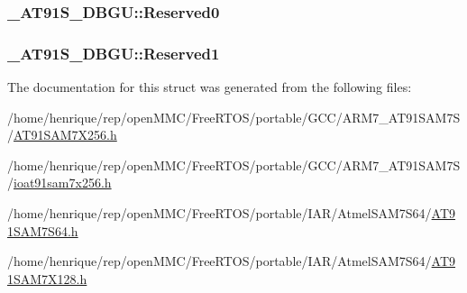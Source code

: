 \hypertarget{struct__AT91S__DBGU_a255e0adaab84068d3bdf2540d73e8743}{
\subsubsection[{Reserved0}]{ \-\_\-\-A\-T91\-S\-\_\-\-D\-B\-G\-U\-::\-Reserved0}}\label{struct__AT91S__DBGU_a255e0adaab84068d3bdf2540d73e8743}
\hypertarget{struct__AT91S__DBGU_a764beffd3dfa2994117ce80ec178ac8a}{
\subsubsection[{Reserved1}]{ \-\_\-\-A\-T91\-S\-\_\-\-D\-B\-G\-U\-::\-Reserved1}}\label{struct__AT91S__DBGU_a764beffd3dfa2994117ce80ec178ac8a}


The documentation for this struct was generated from the following files\-:\begin{DoxyCompactItemize}
\item 
/home/henrique/rep/open\-M\-M\-C/\-Free\-R\-T\-O\-S/portable/\-G\-C\-C/\-A\-R\-M7\-\_\-\-A\-T91\-S\-A\-M7\-S/\hyperlink{GCC_2ARM7__AT91SAM7S_2AT91SAM7X256_8h}{A\-T91\-S\-A\-M7\-X256.\-h}\item 
/home/henrique/rep/open\-M\-M\-C/\-Free\-R\-T\-O\-S/portable/\-G\-C\-C/\-A\-R\-M7\-\_\-\-A\-T91\-S\-A\-M7\-S/\hyperlink{ioat91sam7x256_8h}{ioat91sam7x256.\-h}\item 
/home/henrique/rep/open\-M\-M\-C/\-Free\-R\-T\-O\-S/portable/\-I\-A\-R/\-Atmel\-S\-A\-M7\-S64/\hyperlink{AT91SAM7S64_8h}{A\-T91\-S\-A\-M7\-S64.\-h}\item 
/home/henrique/rep/open\-M\-M\-C/\-Free\-R\-T\-O\-S/portable/\-I\-A\-R/\-Atmel\-S\-A\-M7\-S64/\hyperlink{AT91SAM7X128_8h}{A\-T91\-S\-A\-M7\-X128.\-h}\end{DoxyCompactItemize}
